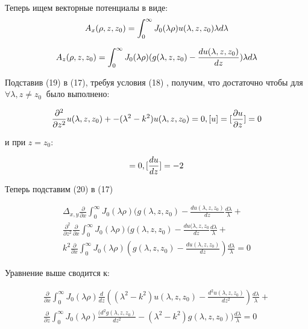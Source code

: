 	Теперь ищем векторные потенциалы в виде:
	\begin{equation}
		A_x(\rho, z, z_0) = \int_0^\infty J_0(\lambda \rho) u(\lambda, z, z_0)\lambda d\lambda \\ 
	\end{equation}
	
	\begin{equation}
		A_z(\rho, z, z_0) = \int_0^\infty J_0(\lambda \rho) (g(\lambda, z, z_0) - \frac{du(\lambda, z, z_0)}{dz})\lambda d\lambda \\ 
	\end{equation}
	
	Подставив (19) в (17), требуя условия (18) , получим, что достаточно чтобы для $\forall \lambda, z \neq z_0\ $ было выполнено:
	
	\begin{equation}
		\frac{\partial^2}{\partial z^2}u(\lambda, z, z_0) + - (\lambda^2 - k^2) u(\lambda, z, z_0) = 0,
		 \newline
		  [{u}]  = [\frac{\partial u}{\partial z}] = 0 
	\end{equation}
	
	и при $z = z_0$:
	
	\begin{equation}
		[{u}] = 0, \space  [\frac{du}{dz}] = -2\\
	\end{equation}
	
	Теперь подставим (20) в (17) 
	
	\begin{equation}
		\begin{aligned}
			\Delta_{x, y} \frac{\partial}{\partial x}\int_0^\infty J_0(\lambda \rho) (g(\lambda, z, z_0) - \frac{du(\lambda, z, z_0)}{dz}\frac{d \lambda}{ 	\lambda} + \\ \frac{\partial^2}{\partial z^2} \frac{\partial}{\partial x}\int_0^\infty J_0(\lambda \rho) (g(\lambda, z, z_0) - \frac{du(\lambda, z, z_0}{dz} \frac{d \lambda}{\lambda} + \\    k^2\frac{\partial}{\partial x}\int_0^\infty J_0(\lambda \rho) (g(\lambda, z, z_0) - \frac{du(\lambda, z, z_0)}{dz}) \frac{d \lambda}{\lambda} = 0              
		\end{aligned}
	\end{equation}
	
	\newpage
	
	Уравнение выше сводится к:
	
	\begin{equation}
		\begin{aligned}
			\frac{\partial}{\partial x} \int_0^\infty J_0(\lambda \rho)\frac{d}{dz}((\lambda^2 - k^2)u(\lambda, z, z_0) - \frac{d^2 u(\lambda, z, z_0)}{dz^2})\frac{d\lambda}{\lambda} + \\ \frac{\partial}{\partial z} \int_0^\infty J_0(\lambda \rho) \frac{(d^2g(\lambda, z, z_0)}{dz^2} - (\lambda^2 - k^2)g(\lambda, z, z_0))\frac{d \lambda}{\lambda} = 0 
		\end{aligned}
	\end{equation}
	
